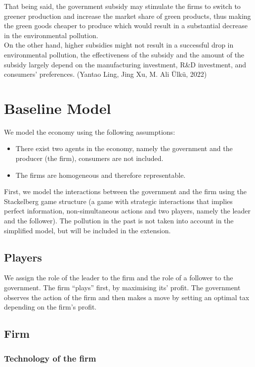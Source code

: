 \documentclass{article}
\begin{document}
That being said, the government subsidy may stimulate the firms to switch to greener production and increase the market share of green products, thus making the green goods cheaper to produce which would result in a substantial decrease in the environmental pollution. \\

On the other hand, higher subsidies might not result in a successful drop in environmental pollution, the effectiveness of the subsidy and the amount of the subsidy largely depend on the manufacturing investment, R\&D investment, and consumers' preferences. (Yantao Ling, Jing Xu, M. Ali Ülkü, 2022)


\section{Baseline Model}
We model the economy using the following assumptions: 

\begin{itemize}
    \item There exist two agents in the economy, namely the government and the producer (the firm), consumers are not included.
    \item The firms are homogeneous and therefore representable. 
\end{itemize} 

First, we model the interactions between the government and the firm using the Stackelberg game structure (a game with strategic interactions that implies perfect information, non-simultaneous actions and two players, namely the leader and the follower). The pollution in the past is not taken into account in the simplified model, but will be included in the extension. 

\subsection{Players}
We assign the role of the leader to the firm and the role of a follower to the government. The firm  “plays” first, by maximising its' profit. The government observes the action of the firm and then makes a move by setting an optimal tax depending on the firm's profit. \\

\subsection{Firm}

\subsubsection{Technology of the firm}
\end{document}
